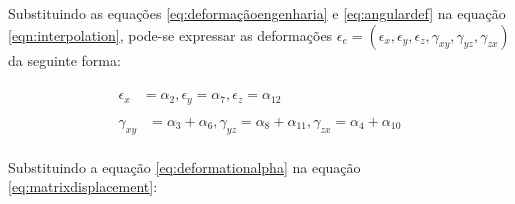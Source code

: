 Substituindo as equações \ref{eq:deformaçãoengenharia} e \ref{eq:angulardef}
na equação \ref{eqn:interpolation}, pode-se expressar as deformações
$\epsilon_{e} = (\epsilon_{x}, \epsilon_{y}, \epsilon_{z}, \gamma_{xy}, \gamma_{yz}, \gamma_{zx})$ da seguinte forma:

\begin{align}\label{eq:deformationalpha}
    \begin{aligned}
        \begin{split}
            \epsilon_{x} &= \alpha_{2}, \epsilon_{y} = \alpha_{7},    \epsilon_{z} = \alpha_{12} 
        \end{split}
        \\
        \begin{split}
             \gamma_{xy} &= \alpha_{3} + \alpha_{6}, \gamma_{yz} = \alpha_{8} + \alpha_{11}, \gamma_{zx} = \alpha_{4} + \alpha_{10}
        \end{split}
    \end{aligned}
\end{align}

Substituindo a equação \ref{eq:deformationalpha} na equação \ref{eq:matrixdisplacement}:

